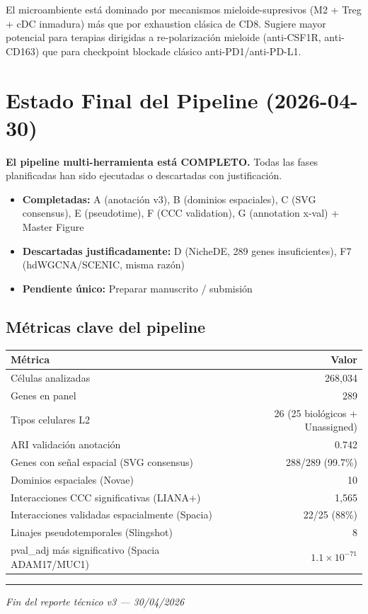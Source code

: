 \documentclass[11pt,a4paper]{article}
\begin{document}
El microambiente está dominado por mecanismos mieloide-supresivos (M2 + Treg + cDC inmadura) más que por exhaustion clásica de CD8. Sugiere mayor potencial para terapias dirigidas a re-polarización mieloide (anti-CSF1R, anti-CD163) que para checkpoint blockade clásico anti-PD1/anti-PD-L1.

\newpage
\section{Estado Final del Pipeline (2026-04-30)}

\textbf{El pipeline multi-herramienta está COMPLETO.} Todas las fases planificadas han sido ejecutadas o descartadas con justificación.

\begin{itemize}[leftmargin=*]
\item \textbf{Completadas:} A (anotación v3), B (dominios espaciales), C (SVG consensus), E (pseudotime), F (CCC validation), G (annotation x-val) + Master Figure
\item \textbf{Descartadas justificadamente:} D (NicheDE, 289 genes insuficientes), F7 (hdWGCNA/SCENIC, misma razón)
\item \textbf{Pendiente único:} Preparar manuscrito / submisión
\end{itemize}

\subsection*{Métricas clave del pipeline}

\begin{tabular}{|l|r|}
\hline
\rowcolor{lightgray}\textbf{Métrica} & \textbf{Valor} \\
\hline
Células analizadas & 268,034 \\
\hline
Genes en panel & 289 \\
\hline
Tipos celulares L2 & 26 (25 biológicos + Unassigned) \\
\hline
ARI validación anotación & 0.742 \\
\hline
Genes con señal espacial (SVG consensus) & 288/289 (99.7\%) \\
\hline
Dominios espaciales (Novae) & 10 \\
\hline
Interacciones CCC significativas (LIANA+) & 1,565 \\
\hline
Interacciones validadas espacialmente (Spacia) & 22/25 (88\%) \\
\hline
Linajes pseudotemporales (Slingshot) & 8 \\
\hline
pval\_adj más significativo (Spacia ADAM17/MUC1) & $1.1 \times 10^{-71}$ \\
\hline
\end{tabular}

\vspace{1cm}
\begin{center}
\rule{0.5\textwidth}{0.4pt}\par
\vspace{0.3cm}
\textit{Fin del reporte técnico v3 --- 30/04/2026}
\end{center}
\end{document}
